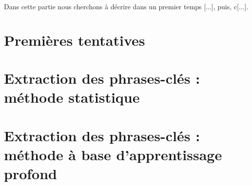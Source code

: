 \label{resultats}

Dans cette partie nous cherchons à décrire dans un premier temps [...], puis, c[...].

\section{Premières tentatives}
\section{Extraction des phrases-clés : méthode statistique}
\section{Extraction des phrases-clés : méthode à base d'apprentissage profond}

